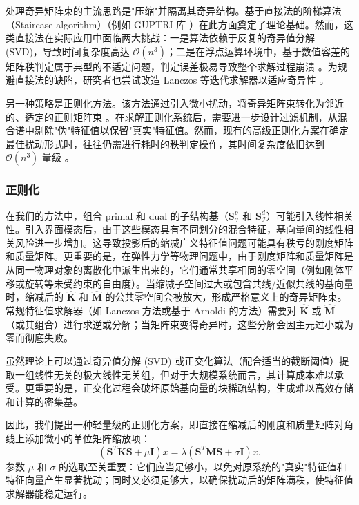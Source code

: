 处理奇异矩阵束的主流思路是"压缩"并隔离其奇异结构。基于直接法的阶梯算法（Staircase algorithm）\cite{Demmel1993TheGS, Van1979Kronecker}（例如 GUPTRI 库 \cite{Demmel1993TheGS}）在此方面奠定了理论基础。然而，这类直接法在实际应用中面临两大挑战：一是算法依赖于反复的奇异值分解 (SVD)，导致时间复杂度高达 $\mathcal{O}(n^3)$；二是在浮点运算环境中，基于数值容差的矩阵秩判定属于典型的不适定问题，判定误差极易导致整个求解过程崩溃 \cite{Edelman2000StaircaseFailures}。为规避直接法的缺陷，研究者也尝试改造 Lanczos 等迭代求解器以适应奇异性 \cite{Lin2021ShiftInvertLanczos, karl2024ShiftInvertArnoldi}。

另一种策略是正则化方法。该方法通过引入微小扰动，将奇异矩阵束转化为邻近的、适定的正则矩阵束 \cite{Fernando2008FirstOrder, Hochstenbach2019SolvingSingular}。在求解正则化系统后，需要进一步设计过滤机制，从混合谱中剔除"伪"特征值以保留"真实"特征值。然而，现有的高级正则化方案在确定最佳扰动形式时，往往仍需进行耗时的秩判定操作，其时间复杂度依旧达到 $\mathcal{O}(n^3)$ 量级 \cite{Hochstenbach2019SolvingSingular, karl2024ShiftInvertArnoldi}。

\subsubsection{正则化} \label{sec:regularization}

在我们的方法中，组合 primal 和 dual 的子结构基（$\mathbf{S}^p_{\mathcal{I}}$ 和 $\mathbf{S}^d_{\mathcal{I}}$）可能引入线性相关性。引入界面模态后，由于这些模态具有不同划分的混合特征，基向量间的线性相关风险进一步增加。这导致投影后的缩减广义特征值问题可能具有秩亏的刚度矩阵和质量矩阵。更重要的是，在弹性力学等物理问题中，由于刚度矩阵和质量矩阵是从同一物理对象的离散化中派生出来的，它们通常共享相同的零空间（例如刚体平移或旋转等未受约束的自由度）。当缩减子空间过大或包含共线/近似共线的基向量时，缩减后的 $\hat{\mathbf{K}}$ 和 $\hat{\mathbf{M}}$ 的公共零空间会被放大，形成严格意义上的奇异矩阵束。常规特征值求解器（如 Lanczos 方法或基于 Arnoldi 的方法）需要对 $\hat{\mathbf{K}}$ 或 $\hat{\mathbf{M}}$（或其组合）进行求逆或分解；当矩阵束变得奇异时，这些分解会因主元过小或为零而彻底失败。

虽然理论上可以通过奇异值分解 (SVD) 或正交化算法（配合适当的截断阈值）提取一组线性无关的极大线性无关组，但对于大规模系统而言，其计算成本难以承受。更重要的是，正交化过程会破坏原始基向量的块稀疏结构，生成难以高效存储和计算的密集基。

因此，我们提出一种轻量级的正则化方案，即直接在缩减后的刚度和质量矩阵对角线上添加微小的单位矩阵缩放项：
\begin{equation}
  (\mathbf{S}^T \mathbf{K} \mathbf{S} + \mu \mathbf{I}) x = \lambda
  (\mathbf{S}^T \mathbf{M} \mathbf{S} + \sigma \mathbf{I})x.
  \label{eq:final-eig}
\end{equation}
参数 $\mu$ 和 $\sigma$ 的选取至关重要：它们应当足够小，以免对原系统的"真实"特征值和特征向量产生显著扰动；同时又必须足够大，以确保扰动后的矩阵满秩，使特征值求解器能稳定运行。

